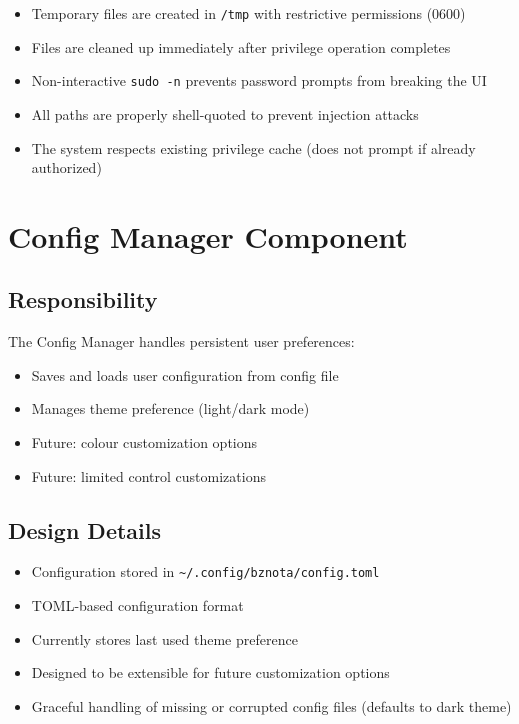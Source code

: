 \documentclass[12pt,a4paper,oneside,openany]{report}
\begin{document}
\begin{itemize}
	\item Temporary files are created in \texttt{/tmp} with restrictive permissions (0600)
	\item Files are cleaned up immediately after privilege operation completes
	\item Non-interactive \texttt{sudo -n} prevents password prompts from breaking the UI
	\item All paths are properly shell-quoted to prevent injection attacks
	\item The system respects existing privilege cache (does not prompt if already authorized)
\end{itemize}

\section{Config Manager Component}

\subsection{Responsibility}

The Config Manager handles persistent user preferences:

\begin{itemize}
	\item Saves and loads user configuration from config file
	\item Manages theme preference (light/dark mode)
	\item Future: colour customization options
	\item Future: limited control customizations
\end{itemize}

\subsection{Design Details}

\begin{itemize}
	\item Configuration stored in \texttt{\textasciitilde/.config/bznota/config.toml }
	\item TOML-based configuration format
	\item Currently stores last used theme preference
	\item Designed to be extensible for future customization options
	\item Graceful handling of missing or corrupted config files (defaults to dark theme)
\end{itemize}
\end{document}
